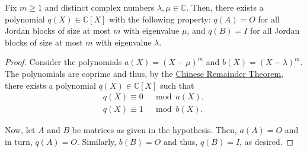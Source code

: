 \documentclass[12pt]{article}
\begin{document}
\begin{thm} \label{thm:interpolating-distinct-eigenvalues}
	Fix $m \ge 1$ and distinct complex numbers $\lambda, \mu \in \mathbb{C}$. \newline
	Then, there exists a polynomial $q(X) \in \mathbb{C}[X]$ with the following property: $q(A) = O$ for all Jordan blocks of size at most $m$ with eigenvalue $\mu$, and $q(B) = I$ for all Jordan blocks of size at most $m$ with eigenvalue $\lambda$.	
\end{thm}
\begin{proof} 
	Consider the polynomials $a(X) = (X - \mu)^{m}$ and $b(X) = (X - \lambda)^{m}$. The polynomials are coprime and thus, by the \href{https://en.wikipedia.org/wiki/Chinese_remainder_theorem#Over_univariate_polynomial_rings_and_Euclidean_domains}{Chinese Remainder Theorem}, there exists a polynomial $q(X) \in \mathbb{C}[X]$ such that
	\begin{align*} 
		q(X) \equiv 0 &\mod a(X), \\
		q(X) \equiv 1 &\mod b(X).
	\end{align*}

	Now, let $A$ and $B$ be matrices as given in the hypothesis. Then, $a(A) = O$ and in turn, $q(A) = O$. Similarly, $b(B) = O$ and thus, $q(B) = I$, as desired.
\end{proof}
\end{document}
